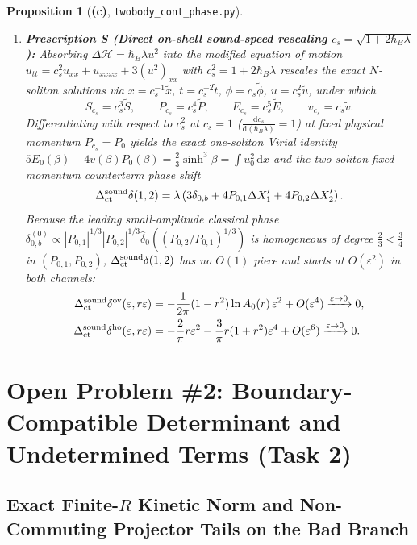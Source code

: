 \documentclass[11pt,a4paper]{article}
\newcommand{\Lc}{\textbf{(c)}}
\newcommand{\script}[1]{\texttt{#1}}
\newcommand{\dd}{\mathrm{d}}
\newtheorem{proposition}{Proposition}[section]
\begin{document}
\begin{proposition}[\Lc, \script{twobody\_cont\_phase.py}]
\begin{enumerate}
\item \textbf{Prescription S (Direct on-shell sound-speed rescaling $c_s=\sqrt{1+2\hbar_B\lambda}$):}
Absorbing $\Delta\mathcal{H}=\hbar_B\lambda u^2$ into the modified equation of motion $u_{tt}=c_s^2 u_{xx}+u_{xxxx}+3(u^2)_{xx}$ with $c_s^2=1+2\hbar_B\lambda$ rescales the exact $N$-soliton solutions via $x=c_s^{-1}\tilde x$, $t=c_s^{-2}\tilde t$, $\phi=c_s\tilde\phi$, $u=c_s^2\tilde u$, under which
\begin{equation}\label{eq:sound_scaling}
S_{c_s}=c_s^3\tilde S,\qquad P_{c_s}=c_s^4\tilde P,\qquad E_{c_s}=c_s^5\tilde E,\qquad v_{c_s}=c_s\tilde v.
\end{equation}
Differentiating with respect to $c_s^2$ at $c_s=1$ ($\frac{\dd c_s}{\dd(\hbar_B\lambda)}=1$) at fixed physical momentum $P_{c_s}=P_0$ yields the exact one-soliton Virial identity $5E_0(\beta)-4v(\beta)P_0(\beta)=\frac23\sinh^3\beta=\int u_0^2\,\dd x$ and the two-soliton fixed-momentum counterterm phase shift
\begin{equation}\label{eq:sound_ct_delta}
\Delta_{\rm ct}^{\rm sound}\delta(1,2)=\lambda\left(3\delta_{0,b}+4P_{0,1}\Delta X_1'+4P_{0,2}\Delta X_2'\right).
\end{equation}
Because the leading small-amplitude classical phase $\delta_{0,b}^{(0)}\propto |P_{0,1}|^{1/3}|P_{0,2}|^{1/3}\hat\delta_0((P_{0,2}/P_{0,1})^{1/3})$ is homogeneous of degree $\frac23<\frac34$ in $(P_{0,1},P_{0,2})$, $\Delta_{\rm ct}^{\rm sound}\delta(1,2)$ has \emph{no $O(1)$ piece} and starts at $O(\varepsilon^2)$ in both channels:
\begin{align}
\Delta_{\rm ct}^{\rm sound}\delta^{\rm ov}(\varepsilon,r\varepsilon)&=-\frac{1}{2\pi}(1-r^2)\ln A_0(r)\,\varepsilon^2+O(\varepsilon^4)\xrightarrow{\varepsilon\to 0}0,\label{eq:sound_ov}\\
\Delta_{\rm ct}^{\rm sound}\delta^{\rm ho}(\varepsilon,r\varepsilon)&=-\frac{2}{\pi}r\varepsilon^2-\frac{3}{\pi}r(1+r^2)\varepsilon^4+O(\varepsilon^6)\xrightarrow{\varepsilon\to 0}0.\label{eq:sound_ho}
\end{align}
\end{enumerate}
\end{proposition}

\section{Open Problem \#2: Boundary-Compatible Determinant and Undetermined Terms (Task 2)}

\subsection{Exact Finite-$R$ Kinetic Norm and Non-Commuting Projector Tails on the Bad Branch}
\end{document}

